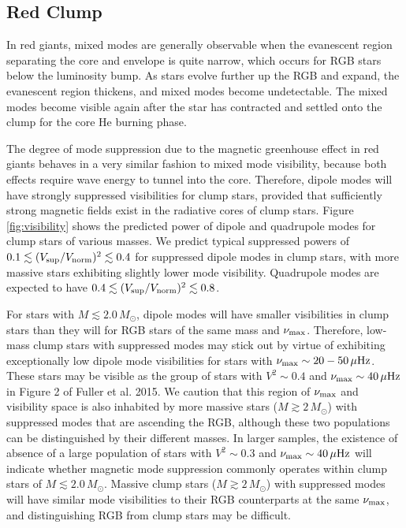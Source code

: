 \subsection{Red Clump}
\label{clump}
  

In red giants, mixed modes are generally observable when the evanescent region separating the core and envelope is quite narrow, which occurs for RGB stars below the luminosity bump. As stars evolve further up the RGB and expand, the evanescent region thickens, and mixed modes become undetectable. The mixed modes become visible again after the star has contracted and settled onto the clump for the core He burning phase. 

The degree of mode suppression due to the magnetic greenhouse effect in red giants behaves in a very similar fashion to mixed mode visibility, because both effects require wave energy to tunnel into the core. Therefore, dipole modes will have strongly suppressed visibilities for clump stars, provided that sufficiently strong magnetic fields exist in the radiative cores of clump stars. Figure \ref{fig:visibility} shows the predicted power of dipole and quadrupole modes for clump stars of various masses. We predict typical suppressed powers of $0.1 \lesssim (V_{\rm sup}/V_{\rm norm})^2 \lesssim 0.4$ for suppressed dipole modes in clump stars, with more massive stars exhibiting slightly lower mode visibility. Quadrupole modes are expected to have $0.4 \lesssim (V_{\rm sup}/V_{\rm norm})^2 \lesssim 0.8$. 

For stars with $M \lesssim 2.0 \, M_\odot$, dipole modes will have smaller visibilities in clump stars than they will for RGB stars of the same mass and $\nu_{\rm max}$. Therefore, low-mass clump stars with suppressed modes may stick out by virtue of exhibiting exceptionally low dipole mode visibilities for stars with $\nu_{\rm max} \sim 20-50 \, \mu {\rm Hz}$. These stars may be visible as the group of stars with $V^2 \sim 0.4$ and $\nu_{\rm max} \sim 40 \, \mu {\rm Hz}$ in Figure 2 of Fuller et al. 2015. We caution that this region of $\nu_{\rm max}$ and visibility space is also inhabited by more massive stars ($M \gtrsim 2 \, M_\odot$) with suppressed modes that are ascending the RGB, although these two populations can be distinguished by their different masses. In larger samples, the existence of absence of a large population of stars with $V^2 \sim 0.3$ and $\nu_{\rm max} \sim 40 \, \mu {\rm Hz}$ will indicate whether magnetic mode suppression commonly operates within clump stars of $M \lesssim 2.0 \, M_\odot$. Massive clump stars ($M \gtrsim 2 \, M_\odot$) with suppressed modes will have similar mode visibilities to their RGB counterparts at the same $\nu_{\rm max}$, and distinguishing RGB from clump stars may be difficult.
  
  
  
  
  
  
  